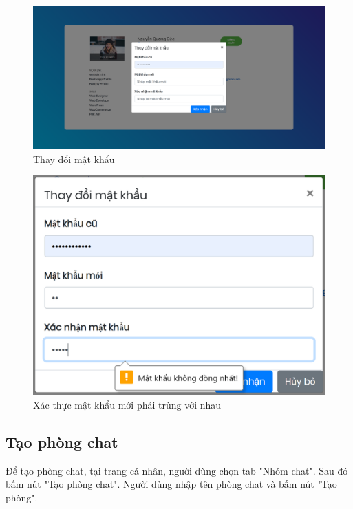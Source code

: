 \documentclass[a4paper]{article}
\begin{document}
	\begin{figure}[H]
		\centering
		\includegraphics[scale=0.36]{change_password.png}
		\caption{Thay đổi mật khẩu}
		\label{F:change_password}
	\end{figure}
	
	\begin{figure}[H]
		\centering
		\includegraphics[scale=0.8]{password_not_match.png}
		\caption{Xác thực mật khẩu mới phải trùng với nhau}
		\label{F:password_not_match}
	\end{figure}
	
	\subsection{Tạo phòng chat}
	Để tạo phòng chat, tại trang cá nhân, người dùng chọn tab "Nhóm chat". Sau đó bấm nút "Tạo phòng chat".\linebreak
	Người dùng nhập tên phòng chat và bấm nút "Tạo phòng".
	
\end{document}
